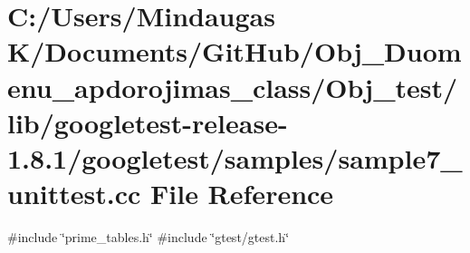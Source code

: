 \hypertarget{_obj__test_2lib_2googletest-release-1_88_81_2googletest_2samples_2sample7__unittest_8cc}{}\section{C\+:/\+Users/\+Mindaugas K/\+Documents/\+Git\+Hub/\+Obj\+\_\+\+Duomenu\+\_\+apdorojimas\+\_\+class/\+Obj\+\_\+test/lib/googletest-\/release-\/1.8.1/googletest/samples/sample7\+\_\+unittest.cc File Reference}
\label{_obj__test_2lib_2googletest-release-1_88_81_2googletest_2samples_2sample7__unittest_8cc}
{\ttfamily \#include \char`\"{}prime\+\_\+tables.\+h\char`\"{}}\newline
{\ttfamily \#include \char`\"{}gtest/gtest.\+h\char`\"{}}\newline
